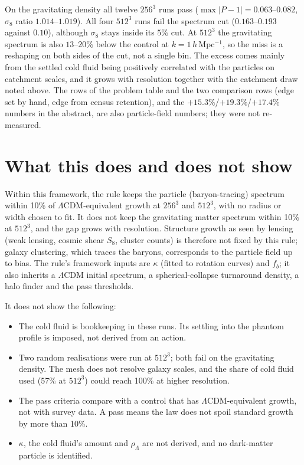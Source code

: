 \documentclass[10pt]{article}
\begin{document}
On the gravitating density all twelve $256^3$ runs pass ($\max|P-1|=0.063$--$0.082$, $\sigma_8$ ratio $1.014$--$1.019$). All four $512^3$ runs fail the spectrum cut ($0.163$--$0.193$ against $0.10$), although $\sigma_8$ stays inside its $5\%$ cut. At $512^3$ the gravitating spectrum is also $13$--$20\%$ below the control at $k=1\,h$\,Mpc$^{-1}$, so the miss is a reshaping on both sides of the cut, not a single bin. The excess comes mainly from the settled cold fluid being positively correlated with the particles on catchment scales, and it grows with resolution together with the catchment draw noted above. The rows of the problem table and the two comparison rows (edge set by hand, edge from census retention), and the $+15.3\%$/$+19.3\%$/$+17.4\%$ numbers in the abstract, are also particle-field numbers; they were not re-measured.

\section{What this does and does not show}
Within this framework, the rule keeps the particle (baryon-tracing) spectrum within 10\% of $\Lambda$CDM-equivalent growth at $256^3$ and $512^3$, with no radius or width chosen to fit. It does not keep the gravitating matter spectrum within 10\% at $512^3$, and the gap grows with resolution. Structure growth as seen by lensing (weak lensing, cosmic shear $S_8$, cluster counts) is therefore not fixed by this rule; galaxy clustering, which traces the baryons, corresponds to the particle field up to bias. The rule's framework inputs are $\kappa$ (fitted to rotation curves) and $f_b$; it also inherits a $\Lambda$CDM initial spectrum, a spherical-collapse turnaround density, a halo finder and the pass thresholds.

It does not show the following:
\begin{itemize}
\item The cold fluid is bookkeeping in these runs. Its settling into the phantom profile is imposed, not derived from an action.
\item Two random realisations were run at $512^3$; both fail on the gravitating density. The mesh does not resolve galaxy scales, and the share of cold fluid used (57\% at $512^3$) could reach 100\% at higher resolution.
\item The pass criteria compare with a control that has $\Lambda$CDM-equivalent growth, not with survey data. A pass means the law does not spoil standard growth by more than 10\%.
\item $\kappa$, the cold fluid's amount and $\rho_\Lambda$ are not derived, and no dark-matter particle is identified.
\end{itemize}
\end{document}
